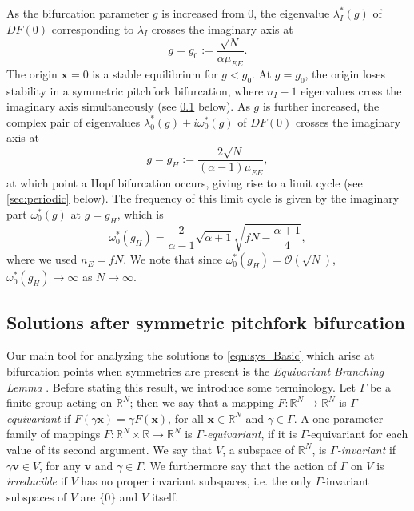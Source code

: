 \documentclass[reqno]{siamonline190516}
\newcommand{\vvec}{\mathbf{v}}
\newcommand{\xvec}{\mathbf{x}}
\begin{document}
As the bifurcation parameter $g$ is increased from 0, the eigenvalue $\lambda_I^*(g)$ of $DF(0)$ corresponding to $\lambda_I$ crosses the imaginary axis at
\begin{equation}\label{eq:pitchlocation}
    g = g_0 := \frac{\sqrt{N}}{\alpha \mu_{EE}}.
\end{equation}
The origin $\xvec = 0$ is a stable equilibrium for $g < g_0$. At $g=g_0$, the origin loses stability in a symmetric pitchfork bifurcation, where $n_I - 1$ eigenvalues cross the imaginary axis simultaneously (see \cref{sec:symmpitch} below). As $g$ is further increased, the complex pair of eigenvalues $\lambda^*_0(g) \pm i \omega^*_0(g)$ of $DF(0)$ crosses the imaginary axis at 
\begin{equation}\label{eq:0hopflocation}
    g = g_H := \frac{ 2\sqrt{N} }{ (\alpha-1)\mu_{EE} },
\end{equation}
at which point a Hopf bifurcation occurs, giving rise to a limit cycle (see \cref{sec:periodic} below). The frequency of this limit cycle is given by the imaginary part $\omega^*_0(g)$ at $g = g_H$, which is
\begin{equation}\label{eq:omegag}
\omega^*_0(g_H) = \frac{2}{\alpha-1}\sqrt{\alpha+1}\sqrt{f N- \frac{\alpha+1}{4}}, 
\end{equation}
where we used $n_E = f N$. We note that since $\omega^*_0(g_H) = \mathcal{O}(\sqrt{N})$, $\omega^*_0(g_H) \rightarrow \infty$ as $N \rightarrow \infty$. 

\subsection{Solutions after symmetric pitchfork bifurcation}\label{sec:symmpitch}

Our main tool for analyzing the solutions to \cref{eqn:sys_Basic} which arise at bifurcation points when symmetries are present is the \emph{Equivariant Branching Lemma} \cite{MR631456,GSS88Vol2,HoyleRebeccaB2006Pf:a}. Before stating this result, we introduce some terminology. Let $\Gamma$ be a finite group acting on $\mathbb{R}^N$; then we say that a mapping $F: \mathbb{R}^N  \rightarrow \mathbb{R}^N$ is \emph{$\Gamma$-equivariant} if $F(\gamma \xvec) = \gamma F(\xvec)$, for all $\xvec \in \mathbb{R}^N$ and $\gamma \in \Gamma$.  A one-parameter family of mappings $F: \mathbb{R}^N \times \mathbb{R}  \rightarrow \mathbb{R}^N$ is \emph{$\Gamma$-equivariant}, if it is $\Gamma$-equivariant for each value of its second argument. We say that $V$, a subspace of $\mathbb{R}^N$, is \emph{$\Gamma$-invariant} if $\gamma \vvec \in V$, for any $\vvec$ and $\gamma \in \Gamma$. We furthermore say that the action of $\Gamma$ on $V$ is \emph{irreducible} if $V$ has no proper invariant subspaces, i.e. the only $\Gamma$-invariant subspaces of $V$ are $\{0\}$ and $V$ itself. 
\end{document}
